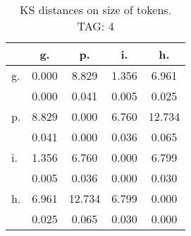 \begin{table}[h!]
\begin{center}
\begin{tabular}{| l | c | c | c | c |}\hline
 & g. & p. & i. & h. \\\hline
g. & 0.000  & 8.829  & 1.356  & 6.961 \\\hline
 & 0.000  & 0.041  & 0.005  & 0.025 \\\hline
p. & 8.829  & 0.000  & 6.760  & 12.734 \\\hline
 & 0.041  & 0.000  & 0.036  & 0.065 \\\hline
i. & 1.356  & 6.760  & 0.000  & 6.799 \\\hline
 & 0.005  & 0.036  & 0.000  & 0.030 \\\hline
h. & 6.961  & 12.734  & 6.799  & 0.000 \\\hline
 & 0.025  & 0.065  & 0.030  & 0.000 \\\hline
\end{tabular}
\caption{KS distances on size of tokens. TAG: 4}
\end{center}
\end{table}